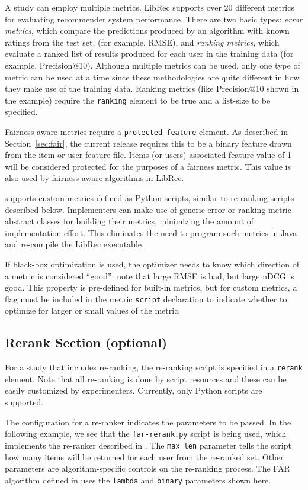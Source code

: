 A study can employ multiple metrics. LibRec supports over 20 different metrics for evaluating recommender system performance. There are two basic types: \textit{error metrics}, which compare the predictions produced by an algorithm with known ratings from the test set, (for example, RMSE), and \textit{ranking metrics}, which evaluate a ranked list of results produced for each user in the training data (for example, Precision@10). Although multiple metrics can be used, only one type of metric can be used at a time since these methodologies are quite different in how they make use of the training data. Ranking metrics (like Precision@10 shown in the example) require the \texttt{ranking} element to be true and a list-size to be specified.

Fairness-aware metrics require a \texttt{protected-feature} element. As described in Section~\ref{sec:fair}, the current release requires this to be a binary feature drawn from the item or user feature file. Items (or users) associated feature value of 1 will be considered protected for the purposes of a fairness metric. This value is also used by fairness-aware algorithms in LibRec.

\libauto{} supports custom metrics defined as Python scripts, similar to re-ranking scripts described below. Implementers can make use of generic error or ranking metric abstract classes for building their metrics, minimizing the amount of implementation effort. This eliminates the need to program such metrics in Java and re-compile the LibRec executable.

If black-box optimization is used, the optimizer needs to know which direction of a metric is considered ``good'': note that large RMSE is bad, but large nDCG is good. This property is pre-defined for built-in metrics, but for custom metrics, a flag must be included in the metric \texttt{script} declaration to indicate whether to optimize for larger or small values of the metric.  

\subsection{Rerank Section (optional)}
\label{subsec:re-ra}
For a study that includes re-ranking, the re-ranking script is specified in a \texttt{rerank} element. Note that all re-ranking is done by script resources and these can be easily customized by experimenters. Currently, only Python scripts are supported.

The configuration for a re-ranker indicates the parameters to be passed. In the following example, we see that the \texttt{far-rerank.py} script is being used, which implements the re-ranker described in \cite{liu2019farpfar}. The \texttt{max\_len} parameter tells the script how many items will be returned for each user from the re-ranked set. Other parameters are algorithm-specific controls on the re-ranking process. The FAR algorithm defined in \cite{liu2019farpfar} uses the \texttt{lambda} and \texttt{binary} parameters shown here.

